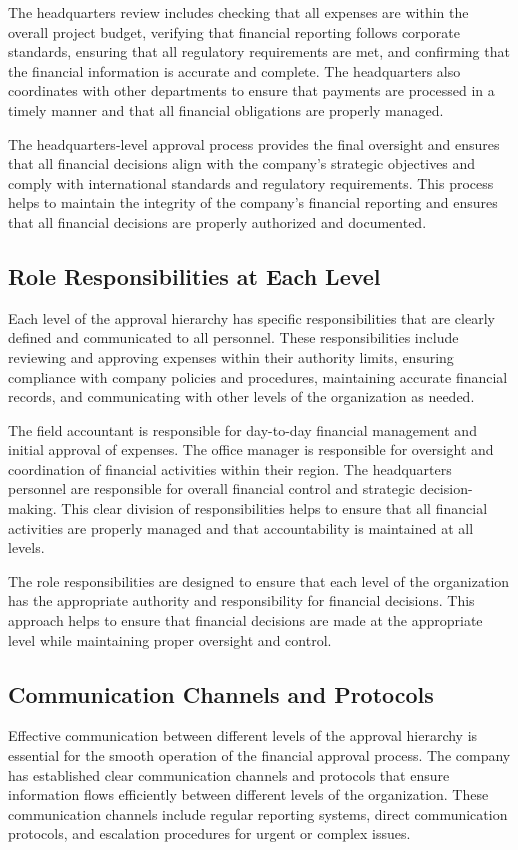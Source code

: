The headquarters review includes checking that all expenses are within the overall project budget, verifying that financial reporting follows corporate standards, ensuring that all regulatory requirements are met, and confirming that the financial information is accurate and complete. The headquarters also coordinates with other departments to ensure that payments are processed in a timely manner and that all financial obligations are properly managed.

The headquarters-level approval process provides the final oversight and ensures that all financial decisions align with the company's strategic objectives and comply with international standards and regulatory requirements. This process helps to maintain the integrity of the company's financial reporting and ensures that all financial decisions are properly authorized and documented.

\subsection{Role Responsibilities at Each Level}
Each level of the approval hierarchy has specific responsibilities that are clearly defined and communicated to all personnel. These responsibilities include reviewing and approving expenses within their authority limits, ensuring compliance with company policies and procedures, maintaining accurate financial records, and communicating with other levels of the organization as needed.

The field accountant is responsible for day-to-day financial management and initial approval of expenses. The office manager is responsible for oversight and coordination of financial activities within their region. The headquarters personnel are responsible for overall financial control and strategic decision-making. This clear division of responsibilities helps to ensure that all financial activities are properly managed and that accountability is maintained at all levels.

The role responsibilities are designed to ensure that each level of the organization has the appropriate authority and responsibility for financial decisions. This approach helps to ensure that financial decisions are made at the appropriate level while maintaining proper oversight and control.

\subsection{Communication Channels and Protocols}
Effective communication between different levels of the approval hierarchy is essential for the smooth operation of the financial approval process. The company has established clear communication channels and protocols that ensure information flows efficiently between different levels of the organization. These communication channels include regular reporting systems, direct communication protocols, and escalation procedures for urgent or complex issues.


